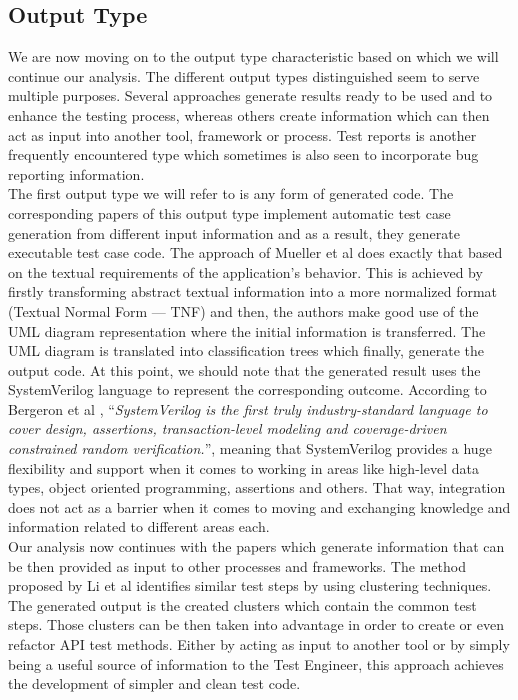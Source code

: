 \subsection {Output Type}
We are now moving on to the output type characteristic based on which we will continue our analysis. The different output types distinguished seem to serve multiple purposes. Several approaches generate 
results ready to be used and to enhance the testing process, whereas others create information which can then act as input into another tool, framework or process. Test reports is another frequently encountered type 
which sometimes is also seen to incorporate bug reporting information.\\

The first output type we will refer to is any form of generated code. The corresponding papers of this output type implement automatic test case generation from different input information and as a result, 
they generate executable test case code. The approach of Mueller et al \cite{inproceedings} does exactly that based on the textual requirements of the application's behavior. This is achieved by firstly 
transforming abstract textual information into a more normalized format (Textual Normal Form --- TNF) and then, the authors make good use of the UML diagram representation where the initial information 
is transferred. The UML diagram is translated into classification trees which finally, generate the output code. At this point, we should note that the generated result uses the SystemVerilog language 
to represent the corresponding outcome. According to Bergeron et al \cite{bergeron2006verification}, ``\emph{SystemVerilog is the first truly industry-standard language to cover design, assertions, 
transaction-level modeling and coverage-driven constrained random verification.}'', meaning that SystemVerilog provides a huge flexibility and support when it comes to working in areas like high-level data types, 
object oriented programming, assertions and others. That way, integration does not act as a barrier when it comes to moving and exchanging knowledge and information related to different areas each.\\

Our analysis now continues with the papers which generate information that can be then provided as input to other processes and frameworks. The method proposed by Li et al \cite{10.1145/3368089.3417067} 
identifies similar test steps by using clustering techniques. The generated output is the created clusters which contain the common test steps. Those clusters can be then taken into advantage in order 
to create or even refactor API test methods. Either by acting as input to another tool or by simply being a useful source of information to the Test Engineer, this approach achieves the development of 
simpler and clean test code.\\

